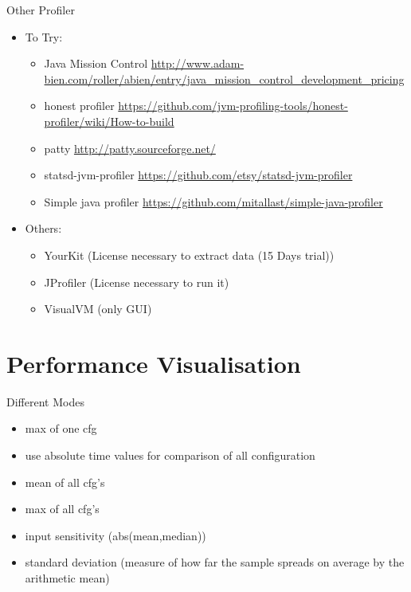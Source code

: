 \documentclass[11pt,aspectratio=169]{beamer}
\begin{document}
\begin{frame}{Other Profiler}
  \begin{itemize}
    \item To Try:
    \begin{itemize}
      \item Java Mission Control \url{http://www.adam-bien.com/roller/abien/entry/java_mission_control_development_pricing}
      \item honest profiler \url{https://github.com/jvm-profiling-tools/honest-profiler/wiki/How-to-build}
      \item patty \url{http://patty.sourceforge.net/}
      \item statsd-jvm-profiler \url{https://github.com/etsy/statsd-jvm-profiler}
      \item Simple java profiler \url{https://github.com/mitallast/simple-java-profiler}
    \end{itemize}
    \item Others:
    \begin{itemize}
      \item YourKit (License necessary to extract data (15 Days trial))
      \item JProfiler (License necessary to run it)
      \item VisualVM (only GUI)
    \end{itemize}
  \end{itemize}
\end{frame}

\section{Performance Visualisation}

\begin{frame}{Different Modes}
  \begin{itemize}
    \item max of one cfg
    \item use absolute time values for comparison of all configuration
    \item mean of all cfg's
    \item max of all cfg's
    \item input sensitivity (abs(mean,median))
    \item standard deviation (measure of how far the sample spreads on average by the arithmetic mean)
  \end{itemize}
\end{frame}
\end{document}
